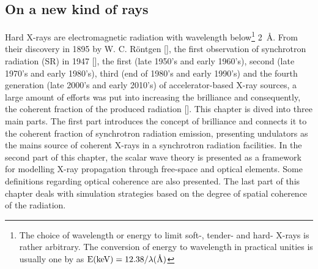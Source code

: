 

\begin{refsection}

\chapter{On a new kind of rays}\label{sec:x-rays}

Hard X-rays are electromagnetic radiation with wavelength below\footnote{The choice of wavelength or energy to limit soft-, tender- and hard- X-rays is rather arbitrary. The conversion of energy to wavelength in practical unities is usually one by as $\text{E}(\text{keV})=12.38/\lambda(\text{\r{A}})$} 2~\r{A}. From their discovery in 1895 by W. C. R\"{o}ntgen [\cite{Roentgen1896}], the first observation of synchrotron radiation (SR) in 1947 [\cite{Elder1947}], the first (late 1950's and early 1960's), second (late 1970's and early 1980's), third (end of 1980's and early 1990's) and the fourth generation (late 2000's and early 2010's) of accelerator-based X-ray sources, a large amount of efforts was put into increasing the brilliance and consequently, the coherent fraction of the produced radiation [\cite{Robinson2015}]. This chapter is dived into three main parts. The first part introduces the concept of brilliance and connects it to the coherent fraction of synchrotron radiation emission, presenting undulators as the mains source of coherent X-rays in a synchrotron radiation facilities. In the second part of this chapter, the scalar wave theory is presented as a framework for modelling X-ray propagation through free-space and optical elements. Some definitions regarding optical coherence are also presented. The last part of this chapter deals with simulation strategies based on the degree of spatial coherence of the radiation.

\end{refsection}
